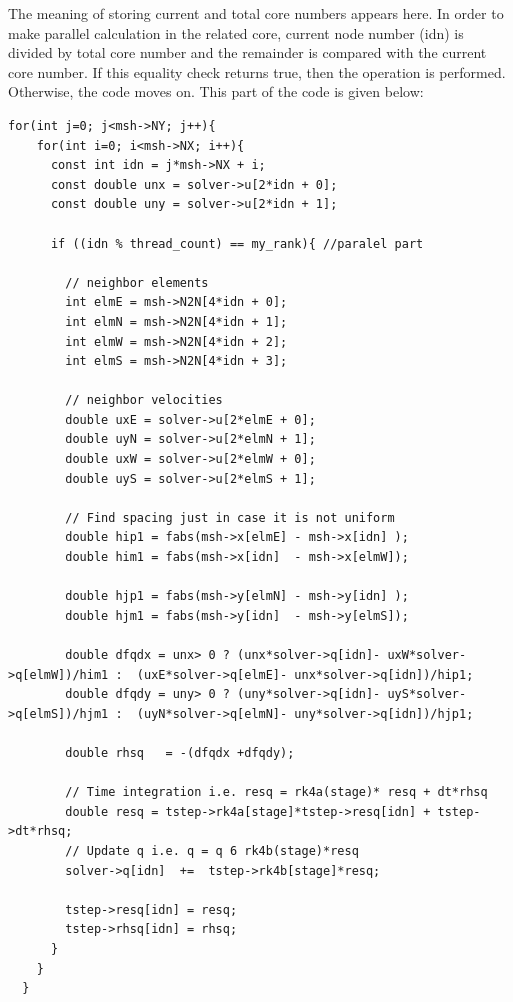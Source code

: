 \documentclass{article}
\begin{document}
The meaning of storing current and total core numbers appears here. In order to make parallel calculation in the related core, current node number (idn) is divided by total core number and the remainder is compared with the current core number. If this equality check returns true, then the operation is performed. Otherwise, the code moves on. This part of the code is given below: 

\begin{verbatim}
for(int j=0; j<msh->NY; j++){
    for(int i=0; i<msh->NX; i++){
      const int idn = j*msh->NX + i; 
      const double unx = solver->u[2*idn + 0];
      const double uny = solver->u[2*idn + 1];

      if ((idn % thread_count) == my_rank){ //paralel part

        // neighbor elements
        int elmE = msh->N2N[4*idn + 0];
        int elmN = msh->N2N[4*idn + 1];
        int elmW = msh->N2N[4*idn + 2];
        int elmS = msh->N2N[4*idn + 3];

        // neighbor velocities
        double uxE = solver->u[2*elmE + 0];
        double uyN = solver->u[2*elmN + 1];
        double uxW = solver->u[2*elmW + 0];
        double uyS = solver->u[2*elmS + 1];

        // Find spacing just in case it is not uniform
        double hip1 = fabs(msh->x[elmE] - msh->x[idn] ); 
        double him1 = fabs(msh->x[idn]  - msh->x[elmW]);  

        double hjp1 = fabs(msh->y[elmN] - msh->y[idn] );  
        double hjm1 = fabs(msh->y[idn]  - msh->y[elmS]);  

        double dfqdx = unx> 0 ? (unx*solver->q[idn]- uxW*solver->q[elmW])/him1 :  (uxE*solver->q[elmE]- unx*solver->q[idn])/hip1;
        double dfqdy = uny> 0 ? (uny*solver->q[idn]- uyS*solver->q[elmS])/hjm1 :  (uyN*solver->q[elmN]- uny*solver->q[idn])/hjp1;

        double rhsq   = -(dfqdx +dfqdy);

        // Time integration i.e. resq = rk4a(stage)* resq + dt*rhsq
        double resq = tstep->rk4a[stage]*tstep->resq[idn] + tstep->dt*rhsq; 
        // Update q i.e. q = q 6 rk4b(stage)*resq
        solver->q[idn]  +=  tstep->rk4b[stage]*resq;

        tstep->resq[idn] = resq; 
        tstep->rhsq[idn] = rhsq; 
      }
    }
  }
\end{verbatim}
\end{document}
